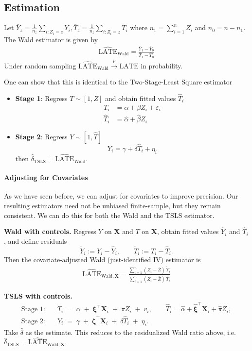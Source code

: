 \documentclass[11pt]{exam}
\theoremstyle{plain}
\newcommand{\inprob}{\overset{p}{\to}}
\newcommand{\bX}{\bm{X}}
\newcommand{\LATE}{\mathrm{LATE}}
\newcommand{\TSLS}{\mathrm{TSLS}}
\begin{document}
\subsection{Estimation}
Let $\overline{Y}_z = \frac{1}{n_z} \sum_{i:Z_i = z} Y_i, \overline{T}_z = \frac{1}{n_z} \sum_{i:Z_i = z} T_i$ where $n_1 = \sum_{i=1}^n Z_i$ and $n_0 = n - n_1$. The Wald estimator is given by
\begin{align*}
    \widehat{\LATE}_{\text{Wald}} = \frac{\overline{Y}_1 - \overline{Y}_0}{\overline{T}_1 - \overline{T}_0}
\end{align*}
Under random sampling $\widehat{\LATE}_{\text{Wald}} \inprob \LATE$ in probability.

One can show that this is identical to the Two-Stage-Least Square estimator
\begin{itemize}
    \item \textbf{Stage 1}: Regress $T \sim [1, Z]$ and obtain fitted values $\hat T_i$
    \begin{align*}
        T_i &= \alpha + \beta Z_i + \varepsilon_i
        \\
        \hat T_i &= \hat \alpha + \hat \beta Z_i
    \end{align*}
    \item \textbf{Stage 2}: Regress $Y \sim [1, \hat T]$ 
    \[
        Y_i = \gamma + \delta \hat T_i + \eta_i
    \]
then $\hat \delta_{\TSLS} = \widehat{\LATE}_{\text{Wald}}$. 
\end{itemize}
\paragraph{Adjusting for Covariates}
As we have seen before, we can adjust for covariates to improve precision. Our resulting estimators need not be unbiased finite-sample, but they remain consistent. We can do this for both the Wald and the TSLS estimator.

\textbf{Wald with controls.} Regress $Y$ on $\bX$ and $T$ on $\bX$, obtain fitted values $\hat Y_i$ and $\hat T_i$, and define residuals
\[
\tilde Y_i:=Y_i-\hat Y_i,\qquad \tilde T_i:=T_i-\hat T_i.
\]
Then the covariate-adjusted Wald (just-identified IV) estimator is
\begin{align*}
\widehat{\LATE}_{\text{Wald},\bX}
= \frac{\sum_{i=1}^n (Z_i-\bar Z)\,\tilde Y_i}{\sum_{i=1}^n (Z_i-\bar Z)\,\tilde T_i}
\end{align*}


\textbf{TSLS with controls.}
\begin{align*}
\text{Stage 1:}\quad & T_i \;=\; \alpha \;+\; \bm{\xi}^\top \bX_i \;+\; \pi Z_i \;+\; v_i,
\qquad \hat T_i=\hat\alpha+\hat{\bm{\xi}}^\top \bX_i+\hat\pi Z_i,\\
\text{Stage 2:}\quad & Y_i \;=\; \gamma \;+\; \bm{\zeta}^\top \bX_i \;+\; \delta \hat T_i \;+\; \eta_i.
\end{align*}
Take $\hat\delta$ as the estimate. This reduces to the residualized Wald ratio above, i.e.\ $\hat\delta_{\TSLS}=\widehat{\LATE}_{\text{Wald},\bX}$.
\end{document}
